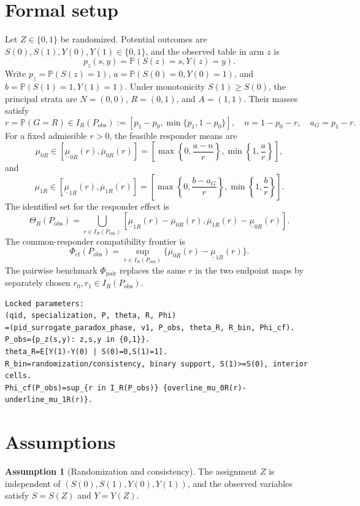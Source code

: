 \documentclass[11pt]{article}
\renewcommand{\Pr}{\mathbb{P}}
\theoremstyle{definition}
\newtheorem{assumption}{Assumption}
\theoremstyle{plain}
\theoremstyle{remark}
\begin{document}
\section{Formal setup}
Let \(Z\in\{0,1\}\) be randomized. Potential outcomes are \(S(0),S(1),Y(0),Y(1)\in\{0,1\}\), and the observed table in arm \(z\) is
\[
  p_z(s,y)=\Pr(S(z)=s,Y(z)=y).
\]
Write \(p_z=\Pr(S(z)=1)\), \(a=\Pr(S(0)=0,Y(0)=1)\), and \(b=\Pr(S(1)=1,Y(1)=1)\). Under monotonicity \(S(1)\ge S(0)\), the principal strata are \(N=(0,0)\), \(R=(0,1)\), and \(A=(1,1)\). Their masses satisfy
\[
  r=\Pr(G=R)\in I_R(P_{\mathrm{obs}}):=[p_1-p_0,\min\{p_1,1-p_0\}],
  \quad n=1-p_0-r,\quad a_G=p_1-r .
\]
For a fixed admissible \(r>0\), the feasible responder means are
\[
  \mu_{0R}\in[\underline\mu_{0R}(r),\overline\mu_{0R}(r)]
  =
  \left[
  \max\left\{0,\frac{a-n}{r}\right\},
  \min\left\{1,\frac{a}{r}\right\}
  \right],
\]
and
\[
  \mu_{1R}\in[\underline\mu_{1R}(r),\overline\mu_{1R}(r)]
  =
  \left[
  \max\left\{0,\frac{b-a_G}{r}\right\},
  \min\left\{1,\frac{b}{r}\right\}
  \right].
\]
The identified set for the responder effect is
\[
  \Theta_R(P_{\mathrm{obs}})
  =
  \bigcup_{r\in I_R(P_{\mathrm{obs}})}
  [\underline\mu_{1R}(r)-\overline\mu_{0R}(r),
   \overline\mu_{1R}(r)-\underline\mu_{0R}(r)].
\]
The common-responder compatibility frontier is
\[
  \Phi_{\mathrm{cf}}(P_{\mathrm{obs}})
  =
  \sup_{r\in I_R(P_{\mathrm{obs}})}
  \{\overline\mu_{0R}(r)-\underline\mu_{1R}(r)\}.
\]
The pairwise benchmark \(\Phi_{\mathrm{pair}}\) replaces the same \(r\) in the two endpoint maps by separately chosen \(r_0,r_1\in I_R(P_{\mathrm{obs}})\).

\begin{verbatim}
Locked parameters:
(qid, specialization, P, theta, R, Phi)
=(pid_surrogate_paradox_phase, v1, P_obs, theta_R, R_bin, Phi_cf).
P_obs={p_z(s,y): z,s,y in {0,1}}.
theta_R=E[Y(1)-Y(0) | S(0)=0,S(1)=1].
R_bin=randomization/consistency, binary support, S(1)>=S(0), interior cells.
Phi_cf(P_obs)=sup_{r in I_R(P_obs)} {overline_mu_0R(r)-underline_mu_1R(r)}.
\end{verbatim}

\section{Assumptions}
\begin{assumption}[Randomization and consistency]\label{ass:rand-cons}
The assignment \(Z\) is independent of \((S(0),S(1),Y(0),Y(1))\), and the observed variables satisfy \(S=S(Z)\) and \(Y=Y(Z)\).
\end{assumption}
\end{document}
